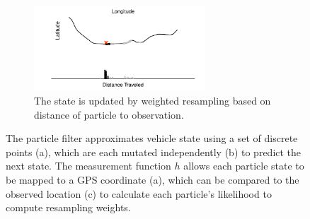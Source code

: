 \begin{figure}[p]
    \begin{subfigure}[t]{0.9\textwidth}
        \centering
        \includegraphics[width=0.7\textwidth]{figures/03_particle_filter_4.pdf}
        \caption{
            The state is updated by weighted resampling based on distance
            of particle to observation.
        }
        \label{fig:pf_state_predict2}
    \end{subfigure}
    \caption{
        The particle filter approximates vehicle state using a set of 
        discrete points (a), which are each mutated independently (b)
        to predict the next state.
        The measurement function $h$ allows each particle state
        to be mapped to a GPS coordinate (a),
        which can be compared to the observed location (c)
        to calculate each particle's likelihood to compute resampling weights.
    }
    \label{fig:pf_state}
\end{figure}

\afterpage{\clearpage}

